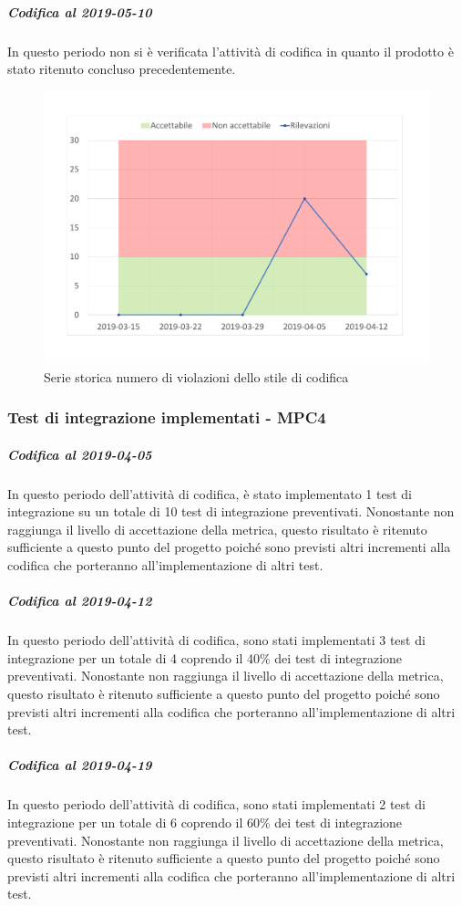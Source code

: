 \subparagraph{Codifica al 2019-05-10}
In questo periodo non si è verificata l'attività di codifica in quanto il prodotto è stato ritenuto concluso precedentemente.

\begin{figure}[H]
	\centering
	\includegraphics[scale=0.6]{images/resoconto/MPC3Chart.pdf}
	\caption{Serie storica numero di violazioni dello stile di codifica}	
\end{figure}

\subsubsection{Test di integrazione implementati - MPC4}
\subparagraph{Codifica al 2019-04-05}
In questo periodo dell'attività di codifica, è stato implementato 1 test di integrazione su un totale di 10 test di integrazione preventivati.
Nonostante non raggiunga il livello di accettazione della
metrica, questo risultato è ritenuto sufficiente a questo punto del progetto poiché sono previsti altri incrementi alla codifica che porteranno all'implementazione di altri test.

\subparagraph{Codifica al 2019-04-12}
In questo periodo dell'attività di codifica, sono stati implementati 3 test di integrazione per un totale di 4 coprendo il 40\% dei test di integrazione preventivati.
Nonostante non raggiunga il livello di accettazione della
metrica, questo risultato è ritenuto sufficiente a questo punto del progetto poiché sono previsti altri incrementi alla codifica che porteranno all'implementazione di altri test. 

\subparagraph{Codifica al 2019-04-19}
In questo periodo dell'attività di codifica, sono stati implementati 2 test di integrazione per un totale di 6 coprendo il 60\% dei test di integrazione preventivati.
Nonostante non raggiunga il livello di accettazione della
metrica, questo risultato è ritenuto sufficiente a questo punto del progetto poiché sono previsti altri incrementi alla codifica che porteranno all'implementazione di altri test. 

